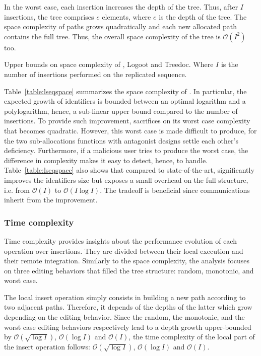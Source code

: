 In the worst case, each insertion increases the depth of the tree. Thus, after
$I$ insertions, the tree comprises $e$ elements, where $e$ is the depth of the
tree. The space complexity of paths grows quadratically and each new allocated
path contains the full tree. Thus, the overall space complexity of the tree is
$\mathcal{O}(I^2)$ too.

\begin{table}
  \caption{\label{table:lseqspace}
    Upper bounds on space complexity of \LSEQ, Logoot and Treedoc. Where
    $I$ is the number of insertions performed on the replicated sequence.}
  \centering
  
\end{table}

Table~\ref{table:lseqspace} summarizes the space complexity of \LSEQ. In
particular, the expected growth of identifiers is bounded between an optimal
logarithm and a polylogarithm, hence, a sub-linear upper bound compared to the
number of insertions. To provide such improvement, \LSEQ sacrifices on its worst
case complexity that becomes quadratic. However, this worst case is made
difficult to produce, for the two sub-allocations functions with antagonist
designs settle each other's deficiency. Furthermore, if a malicious user tries
to produce the worst case, the difference in complexity makes it easy to detect,
hence, to handle. Table~\ref{table:lseqspace} also shows that compared to
state-of-the-art, \LSEQ significantly improves the identifiers size but exposes
a small overhead on the full structure, i.e. from $\mathcal{O}(I)$ to
$\mathcal{O}(I\log I)$. The tradeoff is beneficial since communications inherit
from the improvement.

\subsubsection{Time complexity}
\label{subsubsec:time}

Time complexity provides insights about the performance evolution of each
operation over insertions. They are divided between their local execution and
their remote integration.  Similarly to the space complexity, the analysis
focuses on three editing behaviors that filled the tree structure: random,
monotonic, and worst case.

The local insert operation simply consists in building a new path according to
two adjacent paths. Therefore, it depends of the depths of the latter which grow
depending on the editing behavior. Since the random, the monotonic, and the
worst case editing behaviors respectively lead to a depth growth upper-bounded
by $\mathcal{O}(\sqrt{\log I})$, $\mathcal{O}(\log I)$ and $\mathcal{O}(I)$, the
time complexity of the local part of the insert operation follows:
$\mathcal{O}(\sqrt{\log I})$, $\mathcal{O}(\log I)$ and $\mathcal{O}(I)$.


